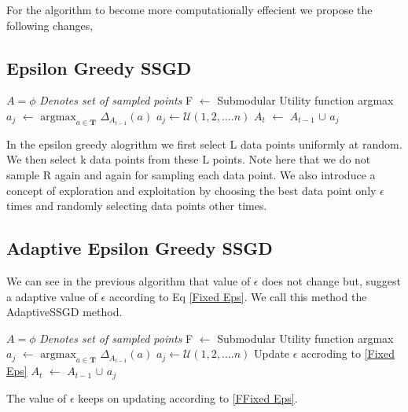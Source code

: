 \documentclass[a4paper,twoside]{iiththesis}
\theoremstyle{definition}
\theoremstyle{definition}
\newcommand{\myalgo}{Submodular-SGD\xspace}
\theoremstyle{remark}
\begin{document}
For the algorithm to become more computationally effecient we propose the following changes,
\subsection{Epsilon Greedy SSGD}
\begin{algorithm}
\caption{\myalgo (eps-SSGD) Algorithm}
\label{sSGD-3}
\begin{algorithmic}[1]
\State $A= \phi$ \Comment \textit{Denotes set of sampled points}
\State  F $\leftarrow$ Submodular Utility function
		\State argmax $a_j $ $\leftarrow$ $\text{argmax}_{a\in \mathbf{T}}$ $\Delta_{A_{t-1}}(a)$
      \Else
      	\State $a_j \leftarrow \mathcal{U}(1, 2, .... n)$
     \EndIf
    \State $A_{t}$ $\leftarrow$ $A_{t -1}$ $\cup$ $a_j$
\EndFor
\end{algorithmic}
\end{algorithm}
In the epsilon greedy alogrithm we first select L data points uniformly at random.
We then select k data points from these L points. Note here that we do not sample R again and again for sampling each data point. We also introduce a concept of exploration and exploitation by choosing the best data point only $\epsilon$ times and randomly selecting data points other times.

\subsection{Adaptive Epsilon Greedy SSGD}
We can see in the previous algorithm that value of $\epsilon$ does not change but, \cite{katharopoulos2018not} suggest a adaptive value of $\epsilon$ according to Eq \ref{Fixed Eps}. We call this method the AdaptiveSSGD method.
\begin{algorithm}
\caption{\myalgo (EpsSSGDMod) Algorithm}
\label{sSGD-4}
\begin{algorithmic}[1]
\State $A= \phi$ \Comment \textit{Denotes set of sampled points}
\State  F $\leftarrow$ Submodular Utility function
		\State argmax $a_j $ $\leftarrow$ $\text{argmax}_{a\in \mathbf{T}}$ $\Delta_{A_{t-1}}(a)$
      \Else
      	\State $a_j \leftarrow \mathcal{U}(1, 2, .... n)$
     \EndIf
     \State Update $\epsilon$ accroding to \ref{Fixed Eps}
    \State $A_{t}$ $\leftarrow$ $A_{t -1}$ $\cup$ $a_j$
\EndFor
\end{algorithmic}
\end{algorithm}
The value of $\epsilon$ keeps on updating according to \ref{FFixed Eps}. 
\end{document}
